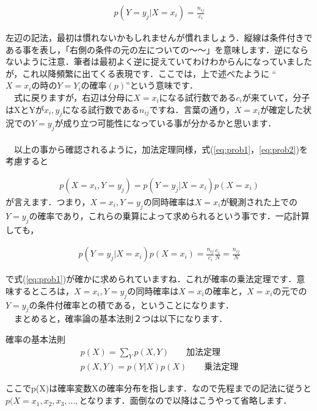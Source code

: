 \documentclass[11pt,a4paper]{jsarticle}                    %
\begin{document}
\begin{eqnarray}
\label{eq:conditional}
p(Y=y_j | X=x_i) = \frac{n_{ij}}{c_i}
\end{eqnarray}

左辺の記法，最初は慣れないかもしれませんが慣れましょう．縦線は条件付きである事を表し，「右側の条件の元の左についての～～」を意味します．逆にならないように注意．筆者は最初よく逆に捉えていてわけわからんになっていましたが，これ以降頻繁に出てくる表現です．ここでは，上で述べたように ``$X=x_iの時のY=Y_iの確率(p)$''という意味です．\\
　式に戻りますが，右辺は分母に$X=x_i$になる試行数である$c_i$が来ていて，分子はXとYが$x_i, y_j$になる試行数である$n_{ij}$ですね．言葉の通り，$X=x_i$が確定した状況での$Y=y_j$が成り立つ可能性になっている事が分かるかと思います．\\
\\
　以上の事から確認されるように，加法定理同様，式(\ref{eq:prob1}，\ref{eq:prob2})を考慮すると

\begin{eqnarray}
\label{eq:product}
p(X=x_i , Y=y_j) = p(Y=y_j | X=x_i)p(X=x_i)
\end{eqnarray}
が言えます．つまり，$X=x_i , Y=y_j$の同時確率は$X=x_i$が観測された上での$Y=y_j$の確率であり，これらの乗算によって求められるという事です．一応計算しても，

\begin{eqnarray}
\label{eq:product}
p(Y=y_j | X=x_i)p(X=x_i) = \frac{n_{ij}}{c_i}\frac{c_i}{N} = \frac{n_{ij}}{N}
\end{eqnarray}

で式(\ref{eq:prob1})が確かに求められていますね．これが確率の乗法定理です．意味するところは，$X=x_i, Y=y_j$の同時確率は$X=x_i$の確率と，$X=x_i$の元での$Y=y_j$の条件付確率との積である，ということになります．
\\
　まとめると，確率論の基本法則２つは以下になります．

\begin{screen}
確率の基本法則
\begin{eqnarray}
p(X) = \sum_Y p(X,Y) \qquad \text{加法定理} \nonumber \\
p(X,Y) = p(Y|X)p(X) \qquad \text{乗法定理} \nonumber
\end{eqnarray}
\end{screen}

ここでp(X)は確率変数Xの確率分布を指します．なので先程までの記法に従うと$p(X=x_1, x_2, x_3, ..., $となります．面倒なので以降はこうやって省略します．
\end{document}
